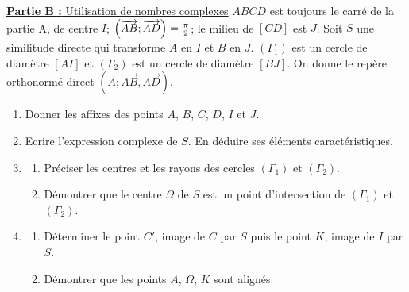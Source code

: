       \underline{\textbf{Partie B :} Utilisation de nombres complexes} \newline
            $ABCD$ est toujours le carr\'e de la partie A, de centre $I$; $\left( \overrightarrow{AB} ; \overrightarrow{AD} \right) = \frac{\pi}{2}$;
            le milieu de $[CD]$ est $J$.
            Soit $S$ une similitude directe qui transforme $A$ en $I$ et $B$ en $J$.
            $(\Gamma_1)$ est un cercle de diam\`etre $[AI]$ et $(\Gamma_2)$ est un cercle de diam\`etre $[BJ]$.
            On donne le rep\`ere orthonorm\'e direct $(A ; \overrightarrow{AB} , \overrightarrow{AD})$.
            \begin{enumerate}
                  \item Donner les affixes des points $A$, $B$, $C$, $D$, $I$ et $J$.
                  \item Ecrire l'expression complexe de $S$.
                        En d\'eduire ses \'el\'ements caract\'eristiques.
                  \item \begin{enumerate}
                              \item Pr\'eciser les centres et les rayons des cercles $(\Gamma_1)$ et $(\Gamma_2)$.
                              \item D\'emontrer que le centre $\Omega$ de $S$ est un point d'intersection de 
                                    $(\Gamma_1)$ et $(\Gamma_2)$.
                        \end{enumerate}
                  \item \begin{enumerate}
                              \item D\'eterminer le point $C'$, image de $C$ par $S$ puis le point $K$, image de $I$ par $S$.
                              \item D\'emontrer que les points $A$, $\Omega$, $K$ sont align\'es.
                        \end{enumerate}
            \end{enumerate}

